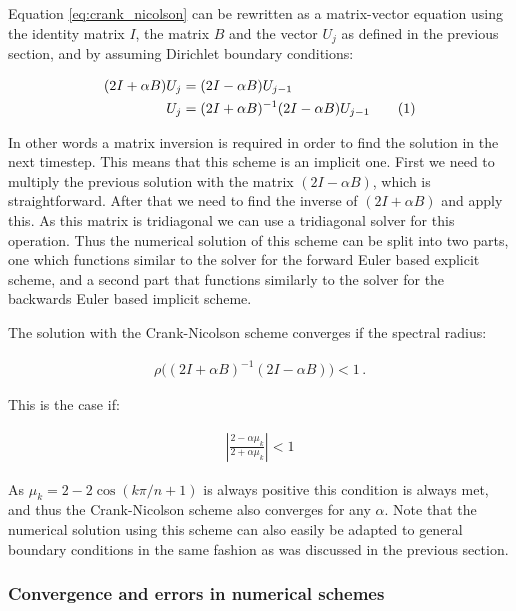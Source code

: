 \documentclass[reprint,english,notitlepage]{revtex4-1}  %
\newcommand\numberthis{\addtocounter{equation}{1}\tag{\theequation}}
\begin{document}
Equation \eqref{eq:crank_nicolson} can be rewritten as a matrix-vector equation using the identity matrix $I$, the matrix $B$ and the vector $U_j$ as defined in the previous section, and by assuming Dirichlet boundary conditions:

\begin{align*}
(2I + \alpha B ) U_j &= (2I - \alpha B) U_{j-1} \\
U_j &= (2I + \alpha B)^{-1} (2I - \alpha B) U_{j-1} \numberthis \label{eq:crank_nicolson_matrix}
\end{align*}

In other words a matrix inversion is required in order to find the solution in the next timestep. This means that this scheme is an implicit one. First we need to multiply the previous solution with the matrix $(2I - \alpha B)$, which is straightforward. After that we need to find the inverse of $(2I + \alpha B)$ and apply this. As this matrix is tridiagonal we can use a tridiagonal solver for this operation. Thus the numerical solution of this scheme can be split into two parts, one which functions similar to the solver for the forward Euler based explicit scheme, and a second part that functions similarly to the solver for the backwards Euler based implicit scheme.

The solution with the Crank-Nicolson scheme converges if the spectral radius:

\begin{align*}
\rho\bigg( (2I + \alpha B)^{-1} (2I - \alpha B) \bigg) < 1 \, .
\end{align*}

This is the case if:

\begin{align*}
| \frac{2 - \alpha \mu_k}{2 + \alpha \mu_k} | < 1
\end{align*}

As $\mu_k = 2 - 2 \cos(k\pi/n + 1)$ is always positive this condition is always met, and thus the Crank-Nicolson scheme also converges for any $\alpha$. Note that the numerical solution using this scheme can also easily be adapted to general boundary conditions in the same fashion as was discussed in the previous section.

\subsubsection{Convergence and errors in numerical schemes} \label{sec:formalism_1D_diff_eq_numerical_conv_and_err}
\end{document}
